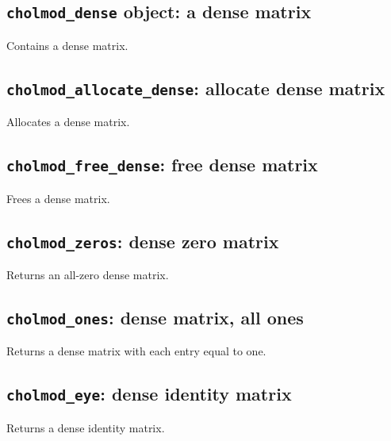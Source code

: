 \documentclass[11pt]{article}
\begin{document}
\subsection{{\tt cholmod\_dense} object: a dense matrix}


Contains a dense matrix.

\subsection{{\tt cholmod\_allocate\_dense}: allocate dense matrix}


Allocates a dense matrix.

\subsection{{\tt cholmod\_free\_dense}: free dense matrix}


Frees a dense matrix.

\newpage \subsection{{\tt cholmod\_zeros}: dense zero matrix}


Returns an all-zero dense matrix.

\subsection{{\tt cholmod\_ones}: dense matrix, all ones}


Returns a dense matrix with each entry equal to one.

\subsection{{\tt cholmod\_eye}: dense identity matrix}


Returns a dense identity matrix.
\end{document}
